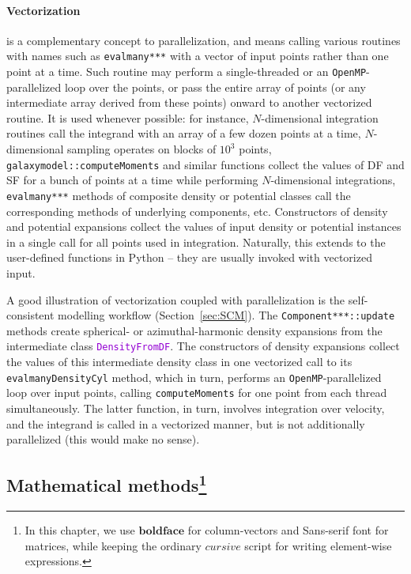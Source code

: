 \documentclass[12pt]{article}
\newcommand{\ttt}[1]{\textcolor{darkviolet}{\texttt{#1}}}
\begin{document}
\paragraph{Vectorization}  is a complementary concept to parallelization, and means calling various routines with names such as \texttt{evalmany***} with a vector of input points rather than one point at a time. Such routine may perform a single-threaded or an \texttt{OpenMP}-parallelized loop over the points, or pass the entire array of points (or any intermediate array derived from these points) onward to another vectorized routine. It is used whenever possible: for instance, $N$-dimensional integration routines call the integrand with an array of a few dozen points at a time, $N$-dimensional sampling operates on blocks of $10^3$ points, \texttt{galaxymodel::computeMoments} and similar functions collect the values of DF and SF for a bunch of points at a time while performing $N$-dimensional integrations, \texttt{evalmany***} methods of composite density or potential classes call the corresponding methods of underlying components, etc. Constructors of density and potential expansions collect the values of input density or potential instances in a single call for all points used in integration. Naturally, this extends to the user-defined functions in Python -- they are usually invoked with vectorized input. 

A good illustration of vectorization coupled with parallelization is the self-consistent modelling workflow (Section~\ref{sec:SCM}). The \texttt{Component***::update} methods create spherical- or azimuthal-harmonic density expansions from the intermediate class \ttt{DensityFromDF}. The constructors of density expansions collect the values of this intermediate density class in one vectorized call to its \texttt{evalmanyDensityCyl} method, which in turn, performs an \texttt{OpenMP}-parallelized loop over input points, calling \texttt{computeMoments} for one point from each thread simultaneously. The latter function, in turn, involves integration over velocity, and the integrand is called in a vectorized manner, but is not additionally parallelized (this would make no sense).

\subsection[Mathematical methods]
{Mathematical methods\protect\footnote{
In this chapter, we use $\boldsymbol{boldface}$ for column-vectors and \textsf{Sans-serif} font for matrices, while keeping the ordinary $cursive$ script for writing element-wise expressions.}}
\end{document}
